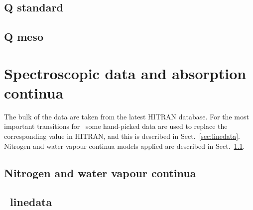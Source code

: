\clearpage
\newpage
\subsection{Q standard}
\label{sec:standard}
\clearpage
\newpage

\subsection{Q meso}
\label{sec:meso}

\clearpage
\newpage
\section{Spectroscopic data and absorption continua}
\label{sec:spectroscopy}

The bulk of the data are taken from the latest HITRAN database.
For the most important transitions for \smr\ some hand-picked
data are used to replace the corresponding value in HITRAN,
and this is described in Sect.~\ref{sec:linedata}.
Nitrogen and water vapour continua models applied
are described in Sect.~\ref{sec:continua}.


\subsection{Nitrogen and water vapour continua}
\label{sec:continua}

\subsection{\smr\ linedata}
\label{sec:linedata}

